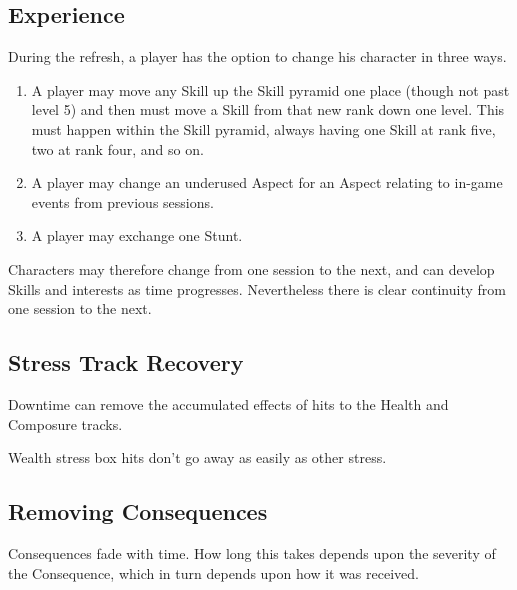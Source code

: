 \subsection{Experience}\label{sec:Experience} %

During the refresh, a player has the option to change his character in three ways.

\begin{enumerate}
\item A player may move any Skill up the Skill pyramid one place (though not past level 5) and then must move a Skill from that new rank down one level. This must happen within the Skill pyramid, always having one Skill at rank five, two at rank four, and so on.

\item A player may change an underused Aspect for an Aspect relating to in-game events from previous sessions.

\item A player may exchange one Stunt.
\end{enumerate}

Characters may therefore change from one session to the next, and can develop Skills and interests as time progresses. Nevertheless there is clear continuity from one session to the next.

\subsection{Stress Track Recovery}\label{sec:Stress Track Recovery} %

Downtime can remove the accumulated effects of hits to the Health and Composure tracks.


Wealth stress box hits don't go away as easily as other stress.


\subsection{Removing Consequences}\label{sec:Removing Consequences} %

Consequences fade with time. How long this takes depends upon the severity of the Consequence, which in turn depends upon how it was received.

